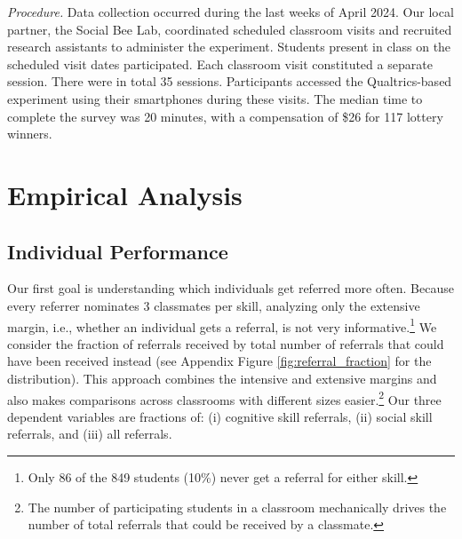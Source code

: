 \documentclass[11pt,a4paper,oneside]{article}
\begin{document}
\noindent \textit{Procedure.} Data collection occurred during the last weeks of April 2024. Our local partner, the Social Bee Lab, coordinated scheduled classroom visits and recruited research assistants to administer the experiment. Students present in class on the scheduled visit dates participated. Each classroom visit constituted a separate session.  There were in total 35 sessions. Participants accessed the Qualtrics-based experiment using their smartphones during these visits. The median time to complete the survey was 20 minutes, with a compensation of \$26 for 117 lottery winners.

\section{Empirical Analysis}
\subsection{Individual Performance}
Our first goal is understanding which individuals get referred more often. Because every referrer nominates 3 classmates per skill, analyzing only the extensive margin, i.e., whether an individual gets a referral, is not very informative.\footnote{Only 86 of the 849 students (10\%) never get a referral for either skill.} We consider the fraction of referrals received by total number of referrals that could have been received instead (see Appendix Figure \ref{fig:referral_fraction} for the distribution). This approach combines the intensive and extensive margins and also makes comparisons across classrooms with different sizes easier.\footnote{The number of participating students in a classroom mechanically drives the number of total referrals that could be received by a classmate.} Our three dependent variables are fractions of: (i) cognitive skill referrals, (ii) social skill referrals, and (iii) all referrals.  
\end{document}
